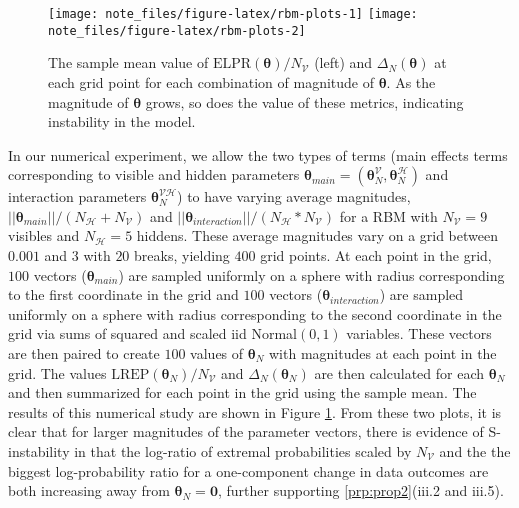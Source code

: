 \documentclass[numbib]{imamat}
\theoremstyle{theorem}
\theoremstyle{lemma}
\theoremstyle{example}
\theoremstyle{corollary}
\theoremstyle{definition}
\theoremstyle{remark}
\theoremstyle{approximation}
\theoremstyle{scheme}
\newcommand{\REP}{\mathrm{LREP}}
\newcommand{\DN}{\Delta_N}
\newcommand{\ak}[1]{{\color{blue} #1}}
\begin{document}
\par
\begin{figure}
\texttt{[image: note\_files/figure-latex/rbm-plots-1]} \texttt{[image: note\_files/figure-latex/rbm-plots-2]} \caption{The sample mean value of $\text{ELPR}(\boldsymbol \theta)/N_{\mathcal{V}}$ (left) and $\DN(\boldsymbol \theta)$ at each grid point for each combination of magnitude of $\boldsymbol \theta$. As the magnitude of $\boldsymbol \theta$ grows, so does the value of these metrics, indicating \ak{instability} in the model.}\label{fig:rbm-plots}
\end{figure}
In our numerical experiment, we allow the two types of terms (main effects terms corresponding to visible and hidden parameters \(\boldsymbol \theta_{main} = (\boldsymbol \theta_N^{\mathcal{V}}, \boldsymbol \theta_N^{\mathcal{H}})\) and interaction parameters \(\boldsymbol \theta_N^{\mathcal{VH}}\)) to have varying average magnitudes, \(||\boldsymbol \theta_{main} || /(N_{\mathcal{H}}+N_{\mathcal{V}})\) and \(||\boldsymbol \theta_{interaction} || /(N_{\mathcal{H}}*N_{\mathcal{V}})\) for a RBM with \(N_\mathcal{V} = 9\) visibles and \(N_\mathcal{H} = 5\) hiddens. These average magnitudes vary on a grid between \(0.001\) and \(3\) with \(20\) breaks, yielding \(400\) grid points. At each point in the grid, \(100\) vectors (\(\boldsymbol \theta_{main}\)) are sampled uniformly on a sphere with radius corresponding to the first coordinate in the grid and \(100\) vectors (\(\boldsymbol \theta_{interaction}\)) are sampled uniformly on a sphere with radius corresponding to the second coordinate in the grid via sums of squared and scaled iid Normal\((0, 1)\) variables. These vectors are then paired to create \(100\) values of \(\boldsymbol \theta_N\) with magnitudes at each point in the grid. The values \(\REP(\boldsymbol \theta_N)/N_{\mathcal{V}}\) and \(\DN(\boldsymbol \theta_N)\) are then calculated for each \(\boldsymbol \theta_N\) and then summarized for each point in the grid using the sample mean. The results of this numerical study are shown in Figure \ref{fig:rbm-plots}. From these two plots, it is clear that for larger magnitudes of the parameter vectors, there is evidence of S-instability in that the log-ratio of extremal probabilities scaled by \(N_{\mathcal{V}}\) and the the biggest log-probability ratio for a one-component change in data outcomes are both increasing away from \(\boldsymbol \theta_N = \boldsymbol 0\), further supporting \ref{prp:prop2}(iii.2 and iii.5).
\end{document}
